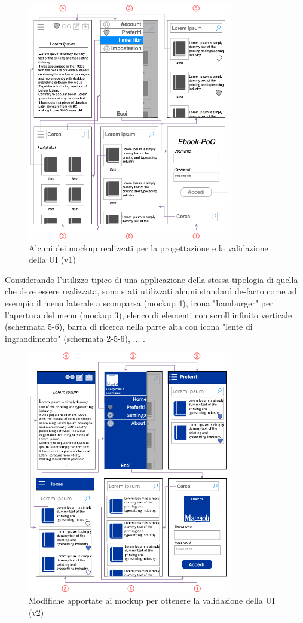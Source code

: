 \begin{figure}[H]
\centering
\includegraphics[width=0.8\textwidth]{img/tesi-14-mockup1.drawio.png}
\caption{Alcuni dei mockup realizzati per la progettazione e la validazione della UI (v1)}
\end{figure}

Considerando l'utilizzo tipico di una applicazione della stessa tipologia di quella che deve essere realizzata, sono stati utilizzati alcuni standard de-facto come ad esempio il menu laterale a scomparsa (mockup 4), icona "hamburger" per l'apertura del menu (mockup 3), elenco di elementi con scroll infinito verticale (schermata 5-6), barra di ricerca nella parte alta con icona "lente di ingrandimento" (schermata 2-5-6), ... .

\begin{figure}[H]
\centering
\includegraphics[width=0.8\textwidth]{img/tesi-23-mockupv2.drawio.png}
\caption{Modifiche apportate ai mockup per ottenere la validazione della UI (v2)}
\end{figure}

